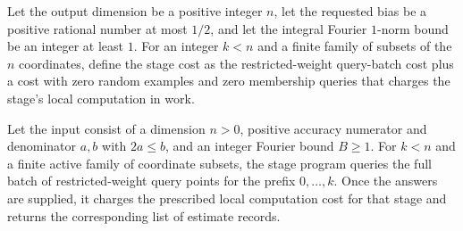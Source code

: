 \begin{definition}
\label{FABL.deterministicGoldreichLevinStageCost}
\leanok
{}
Let the output dimension be a positive integer $n$, let the requested bias be a positive
rational number at most $1/2$, and let the integral Fourier $1$-norm bound be an integer
at least $1$. For an integer $k<n$ and a finite family of subsets of the $n$
coordinates, define the stage cost as the restricted-weight query-batch cost plus a cost
with zero random examples and zero membership queries that charges the stage’s local
computation in work.
\end{definition}

\begin{definition}
\label{FABL.deterministicGoldreichLevinStageProgram}
\leanok
{}
Let the input consist of a dimension $n>0$, positive accuracy numerator and denominator
$a,b$ with $2a\le b$, and an integer Fourier bound $B\ge1$. For $k<n$ and a finite
active family of coordinate subsets, the stage program queries the full batch of
restricted-weight query points for the prefix $0,\ldots,k$. Once the answers are
supplied, it charges the prescribed local computation cost for that stage and returns
the corresponding list of estimate records.
\end{definition}

